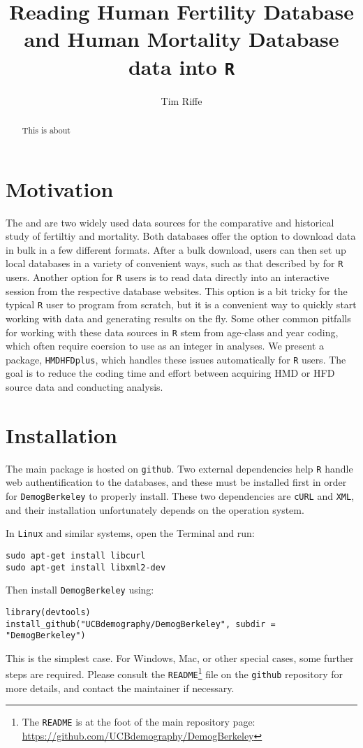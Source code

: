 \documentclass{article}
\begin{document}
\title{Reading Human Fertility Database and Human Mortality Database data into \texttt{R}}
\author{Tim Riffe}
\maketitle
\begin{abstract}
This is about
\end{abstract}

\section{Motivation}
The \citet{HFD} and \citet{HMD} are two widely used data sources
for the comparative and historical study of fertiltiy and mortality. Both
databases offer the option to download data in bulk in a few different formats. After a bulk
download, users can then set up local databases in a variety of
convenient ways, such as that described by \citet{minton2015} for \texttt{R}
\citep{Rcitation} users. Another option for \texttt{R} users is to read data
directly into an interactive session from the respective database websites. This
option is a bit tricky for the typical \texttt{R} user to program from scratch,
but it is a convenient way to quickly start working with data and
generating results on the fly. Some other common pitfalls for working with
these data sources in \texttt{R} stem from age-class and year coding, which
often require coersion to use as an integer in analyses. We present a package,
\texttt{HMDHFDplus}, which handles these issues automatically for \texttt{R}
users. The goal is to reduce the coding time and effort between acquiring
HMD or HFD source data and conducting analysis.

\section{Installation}
The main package is hosted on \texttt{github}. Two external dependencies help
\texttt{R} handle web authentification to the databases, and these must be installed first in order for \texttt{DemogBerkeley}
to properly install. These two dependencies are \texttt{cURL} and \texttt{XML},
and their installation unfortunately depends on the operation system. 

In \texttt{Linux} and similar systems, open the Terminal and run:
\begin{verbatim}
sudo apt-get install libcurl
sudo apt-get install libxml2-dev
\end{verbatim}
Then install \texttt{DemogBerkeley} using:
\begin{verbatim}
library(devtools)
install_github("UCBdemography/DemogBerkeley", subdir = "DemogBerkeley")
\end{verbatim}
This is the simplest case. For Windows, Mac, or other special cases, some
further steps are required. Please consult the
\texttt{README}\footnote{The
\texttt{README} is at the
foot of the main repository
page: \url{https://github.com/UCBdemography/DemogBerkeley}} file on the
\texttt{github} repository for more details, and contact the maintainer if
necessary.
\end{document}
